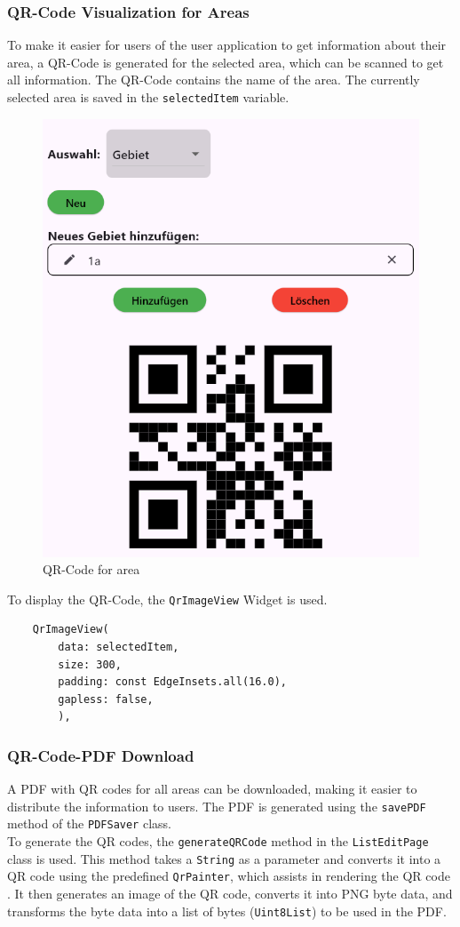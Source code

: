 \subsubsection{QR-Code Visualization for Areas}
To make it easier for users of the user application to get information about their area, a QR-Code is generated for the selected area, which can be scanned to get all information. The QR-Code contains the name of the area. The currently selected area is saved in the \texttt{selectedItem} variable.\\



\begin{figure}[H]
    \centering
    \includegraphics[width=0.4\linewidth]{images/AdminPanel/QrImageView.png}
    \caption{QR-Code for area}
\end{figure}

To display the QR-Code, the \texttt{QrImageView} Widget is used. 

\lstset{style=mycsharp, caption=QrCode Generation in ListEditPage}
\begin{lstlisting}
    QrImageView(
        data: selectedItem,
        size: 300,
        padding: const EdgeInsets.all(16.0),
        gapless: false,
        ),
\end{lstlisting}

\subsubsection{QR-Code-PDF Download}
A PDF with QR codes for all areas can be downloaded, making it easier to distribute the information to users. The PDF is generated using the \texttt{savePDF} method of the \texttt{PDFSaver} class.\\

To generate the QR codes, the \texttt{generateQRCode} method in the \texttt{ListEditPage} class is used. This method takes a \texttt{String} as a parameter and converts it into a QR code using the predefined \texttt{QrPainter}, which assists in rendering the QR code \autocite{pub.dev/QrPainter-class}. It then generates an image of the QR code, converts it into PNG byte data, and transforms the byte data into a list of bytes (\texttt{Uint8List}) to be used in the PDF. \\

